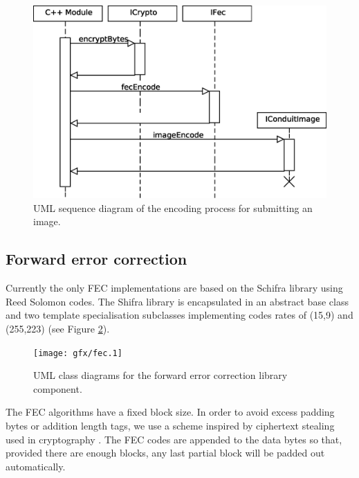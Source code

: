     \begin{figure}[tb]
        \begin{center}
                \includegraphics[width=12cm]{gfx/img-seq.eps}
            \caption{UML sequence diagram of the encoding process for submitting an image.}
            \label{eps:img}
        \end{center}
    \end{figure}


\FloatBarrier
\subsection{Forward error correction}

Currently the only FEC implementations are based on the Schifra library using Reed Solomon codes. The Shifra library is encapsulated in an abstract base class and two template specialisation subclasses implementing codes rates of (15,9) and (255,223) (see Figure \ref{uml:fec}).


    \begin{figure}[tb]
        \begin{center}
                \texttt{[image: gfx/fec.1]}
            \caption{UML class diagrams for the forward error correction library component.}
            \label{uml:fec}
        \end{center}
    \end{figure}

The FEC algorithms have a fixed block size. In order to avoid excess padding bytes or addition length tags, we use a scheme inspired by ciphertext stealing used in cryptography \cite{stealing}. The FEC codes are appended to the data bytes so that, provided there are enough blocks, any last partial block will be padded out automatically.

